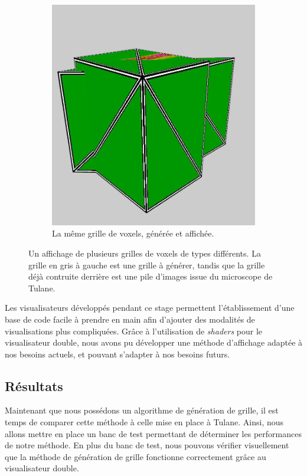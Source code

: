 {{{\begin{figure}[h]
\begin{subfigure}{.45\linewidth}
                    \includegraphics[width=.9\linewidth]{img/visu_screens/grid_generated.jpg}
                    \captionsetup{width=.8\linewidth}
                    \caption{La même grille de voxels, générée et affichée.}
                    \label{img:visualisateur:grids:generated}
                \end{subfigure}
                \captionsetup{width=.9\linewidth}
                \caption{Un affichage de plusieurs grilles de voxels de types différents. La grille en gris à gauche est une grille à générer, tandis que la grille déjà contruite derrière est une pile d'images issue du microscope de Tulane.}
                \label{img:visualisateur:grids}
            \end{figure}

            Les visualisateurs développés pendant ce stage permettent l'établissement d'une base de code facile à prendre en main afin d'ajouter des modalités de visualisations plus compliquées. Grâce à l'utilisation de \textit{shaders} pour le visualisateur double, nous avons pu développer une méthode d'affichage adaptée à nos besoins actuels, et pouvant s'adapter à nos besoins futurs.
        }

        \subsection{Résultats}
        {
            Maintenant que nous possédons un algorithme de génération de grille, il est temps de comparer cette méthode à celle mise en place à Tulane. Ainsi, nous allons mettre en place un banc de test permettant de déterminer les performances de notre méthode. En plus du banc de test, nous pouvons vérifier visuellement que la méthode de génération de grille fonctionne correctement grâce au visualisateur double.

}}}

